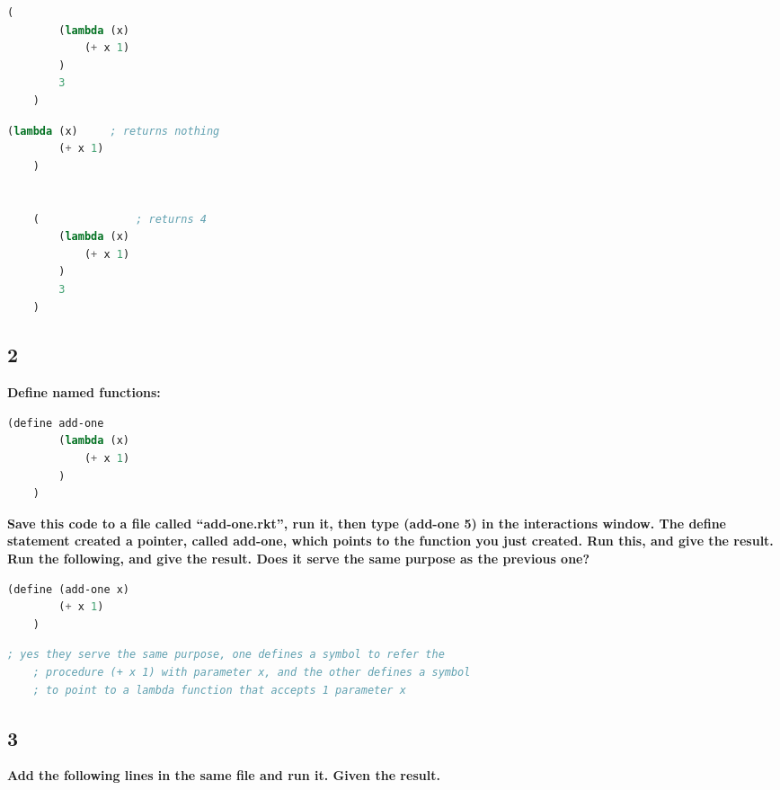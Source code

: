 \documentclass{article}
\begin{document}
\begin{lstlisting}[language=lisp]
    (
        (lambda (x) 
            (+ x 1)
        ) 
        3
    ) 
\end{lstlisting}

\begin{lstlisting}[language=lisp,style=redStyle]
    (lambda (x)     ; returns nothing
        (+ x 1)
    ) 


    (               ; returns 4
        (lambda (x) 
            (+ x 1)
        ) 
        3
    )  
\end{lstlisting}

\subsection*{2}
\begin{adjustwidth}{2em}{0em}
    \textbf{Define named functions:}
\end{adjustwidth}

\begin{lstlisting}[language=lisp]
    (define add-one 
        (lambda (x) 
            (+ x 1)
        )
    ) 
\end{lstlisting}
\begin{adjustwidth}{2em}{0em}
    \textbf{Save this code to a file called “add-one.rkt”, run it, then type (add-one 5) in the interactions window. The define statement created a pointer, called add-one, which points to the function you just created. Run this, and give the result.
    Run the following, and give the result. Does it serve the same purpose as the previous one? 
    }
\end{adjustwidth}

\begin{lstlisting}[language=lisp]
    (define (add-one x) 
        (+ x 1)
    ) 
\end{lstlisting}

\begin{lstlisting}[language=lisp,style=redStyle]
    ; yes they serve the same purpose, one defines a symbol to refer the 
    ; procedure (+ x 1) with parameter x, and the other defines a symbol 
    ; to point to a lambda function that accepts 1 parameter x
\end{lstlisting}

\subsection*{3}
\begin{adjustwidth}{2em}{0em}
    \textbf{Add the following lines in the same file and run it. Given the result. }
\end{adjustwidth}
\end{document}
